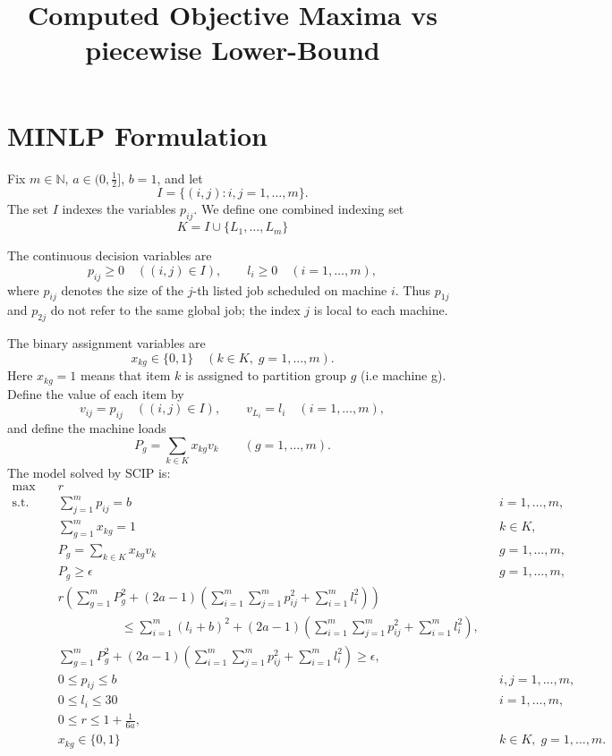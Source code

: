 \documentclass[11pt]{article}
\title{Computed Objective Maxima vs piecewise Lower-Bound}
\author{}
\date{}
\begin{document}
\section*{MINLP Formulation}

Fix \(m\in\mathbb{N}\), \(a\in(0,\frac12]\), \(b=1\), and let
\[
  I=\{(i,j): i,j=1,\ldots,m\}.
\]
The set \(I\) indexes the variables \(p_{ij}\). We define
one combined indexing set
\[
  K=I\cup\{L_1,\ldots,L_m\}
\]

The continuous decision variables are
\[
  p_{ij}\ge 0\quad ((i,j)\in I),\qquad
  l_i\ge 0\quad (i=1,\ldots,m),
\]
where \(p_{ij}\) denotes the size of the \(j\)-th listed job scheduled on
machine \(i\).  Thus \(p_{1j}\) and \(p_{2j}\) do not refer to the same
global job; the index \(j\) is local to each machine.

The binary assignment variables are
\[
  x_{kg}\in\{0,1\}\quad (k\in K,\;g=1,\ldots,m).
\]
Here \(x_{kg}=1\) means that item \(k\) is assigned to partition group
\(g\) (i.e machine g).  Define the value of each item by
\[
  v_{ij}=p_{ij}\quad ((i,j)\in I),
  \qquad
  v_{L_i}=l_i\quad (i=1,\ldots,m),
\]
and define the machine loads
\[
  P_g=\sum_{k\in K}x_{kg}v_k\qquad (g=1,\ldots,m).
\]
The model solved by SCIP is:
\[
\begin{aligned}
\max\quad
  & r \\[0.4em]
\text{s.t.}\quad
  & \sum_{j=1}^m p_{ij}=b
      && i=1,\ldots,m,\\[0.4em]
  & \sum_{g=1}^m x_{kg}=1
      && k\in K,\\[0.4em]
  & P_g=\sum_{k\in K}x_{kg}v_k
      && g=1,\ldots,m,\\[0.4em]
  & P_g\ge \epsilon
      && g=1,\ldots,m,\\[0.4em]
  & r\left(
      \sum_{g=1}^m P_g^2
      +(2a-1)\left(\sum_{i=1}^m\sum_{j=1}^m p_{ij}^2
      +\sum_{i=1}^m l_i^2\right)
    \right)\\
  &\hspace{5em}\le
    \sum_{i=1}^m(l_i+b)^2
    +(2a-1)\left(\sum_{i=1}^m\sum_{j=1}^m p_{ij}^2
    +\sum_{i=1}^m l_i^2\right),\\[0.4em]
  & \sum_{g=1}^m P_g^2
      +(2a-1)\left(\sum_{i=1}^m\sum_{j=1}^m p_{ij}^2
      +\sum_{i=1}^m l_i^2\right)
      \ge \epsilon,\\[0.4em]
  & 0\le p_{ij}\le b
      && i,j=1,\ldots,m,\\[0.4em]
  & 0\le l_i\le 30
      && i=1,\ldots,m,\\[0.4em]
  & 0\le r\le 1+\frac{1}{6a},\\[0.4em]
  & x_{kg}\in\{0,1\}
      && k\in K,\;g=1,\ldots,m.
\end{aligned}
\]
\end{document}
